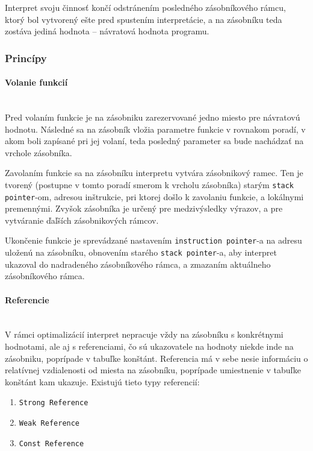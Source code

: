 \documentclass[12pt,a4paper,titlepage,final]{article}
\begin{document}
Interpret svoju činnosť končí odstránením posledného zásobníkového rámcu, ktorý bol vytvorený ešte pred spustením
interpretácie, a na zásobníku teda zostáva jediná hodnota -- návratová hodnota programu. 

\subsubsection{Princípy}

\paragraph{Volanie funkcií}\mbox{}\\

Pred volaním funkcie je na zásobniku zarezervované jedno miesto pre návratovú hodnotu.
Následné sa na zásobník vložia parametre funkcie v rovnakom poradí, v akom boli zapísané pri
jej volaní, teda posledný parameter sa bude nachádzať na vrchole zásobníka. 

Zavolaním funkcie sa na zásobníku interpretu vytvára zásobnikový ramec. Ten je tvorený (postupne v tomto
poradí smerom k vrcholu zásobníka) starým \texttt{stack pointer}-om, adresou inštrukcie, pri ktorej došlo k
zavolaniu funkcie, a lokálnymi premennými. Zvyšok zásobníka je určený pre medzivýsledky výrazov, a pre
vytváranie ďaľších zásobnikových rámcov.

Ukončenie funkcie je sprevádzané nastavením \texttt{instruction pointer}-a na adresu uloženú na zásobníku,
obnovením starého \texttt{stack pointer}-a, aby interpret ukazoval do nadradeného zásobníkového rámca,
a zmazaním aktuálneho zásobníkového rámca.

\paragraph{Referencie}\mbox{}\\

V rámci optimalizácií interpret nepracuje vždy na zásobníku s konkrétnymi hodnotami,
ale aj s referenciami, čo sú ukazovatele na hodnoty niekde inde na zásobniku, poprípade
v tabuľke konštánt. Referencia má v sebe nesie informáciu o relatívnej vzdialenosti od miesta
na zásobníku, poprípade umiestnenie v tabuľke konštánt kam ukazuje. Existujú tieto typy referencií:

\begin{enumerate}
    \itemsep0em
    \item \texttt{Strong Reference}
    \item \texttt{Weak Reference}
    \item \texttt{Const Reference}
\end{enumerate}
\end{document}
